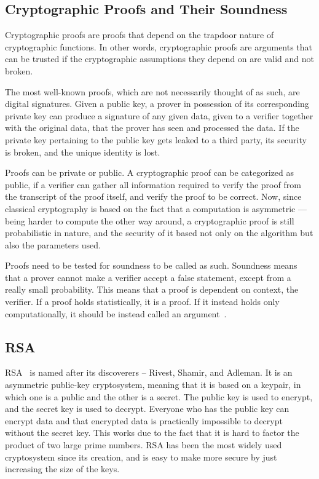\subsection{Cryptographic Proofs and Their Soundness}
Cryptographic proofs are proofs that depend on the trapdoor nature of cryptographic functions. In other words, cryptographic proofs are arguments that can be trusted if the cryptographic assumptions they depend on are valid and not broken.

The most well-known proofs, which are not necessarily thought of as such, are digital signatures. Given a public key, a prover in possession of its corresponding private key can produce a signature of any given data, given to a verifier together with the original data, that the prover has seen and processed the data. If the private key pertaining to the public key gets leaked to a third party, its security is broken, and the unique identity is lost.

Proofs can be private or public. A cryptographic proof can be categorized as public, if a verifier can gather all information required to verify the proof from the transcript of the proof itself, and verify the proof to be correct. Now, since classical cryptography is based on the fact that a computation is asymmetric --- being harder to compute the other way around, a cryptographic proof is still probabilistic in nature, and the security of it based not only on the algorithm but also the parameters used.

Proofs need to be tested for soundness to be called as such. Soundness means that a prover cannot make a verifier accept a false statement, except from a really small probability. This means that a proof is dependent on context, the verifier. If a proof holds statistically, it is a proof. If it instead holds only computationally, it should be instead called an argument~\cite{Bitansky2012-uz}.

\subsection{RSA}
RSA~\cite{Rivest1978-fm} is named after its discoverers – Rivest, Shamir, and Adleman. It is an asymmetric public-key cryptosystem, meaning that it is based on a keypair, in which one is a public and the other is a secret. The public key is used to encrypt, and the secret key is used to decrypt. Everyone who has the public key can encrypt data and that encrypted data is practically impossible to decrypt without the secret key. This works due to the fact that it is hard to factor the product of two large prime numbers. RSA has been the most widely used cryptosystem since its creation, and is easy to make more secure by just increasing the size of the keys.

